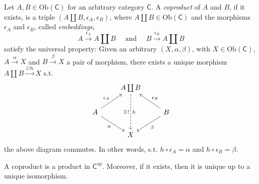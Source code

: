 \begin{defn}[Coproduct]
	Let $A,B \in \mathrm{Ob} \left(\mathsf{C}\right)$ for an arbitrary category $\mathsf{C}$.
	A {\em coproduct} of $A$ and $B$, if it exists,
	is a triple $\left(A \coprod B, \epsilon_A, \epsilon_B \right)$,
	where $A \coprod B \in \mathrm{Ob} \left(\mathsf{C}\right)$
	and the morphisms $\epsilon_A$ and $\epsilon_B$, called {\em embeddings}, 
	\begin{equation}
	A \xrightarrow{\epsilon_A} A \coprod B \quad \text{ and } \quad B \xrightarrow{\epsilon_B} A \coprod B
	\end{equation} 
	satisfy the universal property:
	Given an arbitrary $\left(X, \alpha, \beta\right)$, with $X \in \mathrm{Ob} \left(\mathsf{C}\right)$, $A \xrightarrow{\alpha} X$ and $B \xrightarrow{\beta} X$ a pair of morphism, there exists a unique morphism $A \coprod B \xrightarrow{\exists\, ! h} X$ s.t.
	\begin{equation}
	\begin{tikzcd}
		& A \coprod B \arrow[ld, "\epsilon_A"', leftarrow] \arrow[rd, "\epsilon_B", leftarrow] \arrow[dd, "h", "\exists\, !"', dashrightarrow] \\
		A & & B\\
		  & X \arrow[lu, "\alpha", leftarrow] \arrow[ru, "\beta"', leftarrow] &
	\end{tikzcd}
	\end{equation} 
	the above diagram commutes.
	In other words, s.t. $h \circ \epsilon_A = \alpha$ and $h \circ \epsilon_B = \beta$.
\end{defn}

\begin{rem}
	A coproduct is a product in $\mathsf{C}^{op}$.
	Moreover, if it exists, then it is unique up to a unique isomorphism.
\end{rem}

